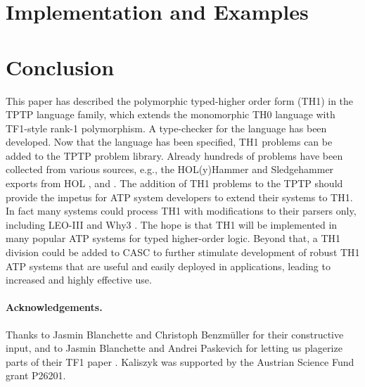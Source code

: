 \documentclass{easychair}
\begin{document}
\section{Implementation and Examples}
\label{ImplementationExamples}

\section{Conclusion}
\label{Conclusion}

This paper has described the polymorphic typed-higher order form (TH1)
in the TPTP language family, which extends the monomorphic TH0 language
with TF1-style rank-1 polymorphism.
A type-checker for the language has been developed.
Now that the language has been specified, TH1 problems can be added to
the TPTP problem library.
Already hundreds of problems have been collected from various sources,
e.g., the HOL(y)Hammer and Sledgehammer exports from HOL \cite{KU15a,SBP13},
and \cite{MI+16}.
The addition of TH1 problems to the TPTP should provide the impetus for ATP
system developers to extend their systems to TH1. In fact many systems 
could process TH1 with modifications to their parsers only, including
LEO-III \cite{WSB14} and Why3 \cite{BF+15}.
The hope is that TH1 will be implemented in many popular ATP systems for
typed higher-order logic.
Beyond that, a TH1 division could be added to CASC to further stimulate
development of robust TH1 ATP systems that are useful and easily deployed in
applications, leading to increased and highly effective use.

\paragraph{Acknowledgements.}
Thanks to Jasmin Blanchette and Christoph Benzm{\"u}ller for their
constructive input, and to Jasmin Blanchette and Andrei Paskevich for
letting us plagerize parts of their TF1 paper \cite{BP13-TFF1}.
Kaliszyk was supported by the Austrian Science Fund grant P26201.



\end{document}
